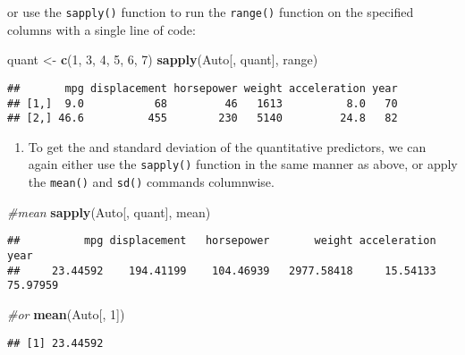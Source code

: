 \documentclass[
]{article}
\newenvironment{Shaded}{\begin{snugshade}}{\end{snugshade}}
\newcommand{\CommentTok}[1]{\textcolor[rgb]{0.56,0.35,0.01}{\textit{#1}}}
\newcommand{\DecValTok}[1]{\textcolor[rgb]{0.00,0.00,0.81}{#1}}
\newcommand{\FunctionTok}[1]{\textcolor[rgb]{0.13,0.29,0.53}{\textbf{#1}}}
\newcommand{\NormalTok}[1]{#1}
\newcommand{\OtherTok}[1]{\textcolor[rgb]{0.56,0.35,0.01}{#1}}
\providecommand{\tightlist}{%
  \setlength{\itemsep}{0pt}\setlength{\parskip}{0pt}}
\begin{document}
or use the \texttt{sapply()} function to run the \texttt{range()}
function on the specified columns with a single line of code:

\begin{Shaded}
\begin{Highlighting}[]
\NormalTok{quant }\OtherTok{\textless{}{-}} \FunctionTok{c}\NormalTok{(}\DecValTok{1}\NormalTok{, }\DecValTok{3}\NormalTok{, }\DecValTok{4}\NormalTok{, }\DecValTok{5}\NormalTok{, }\DecValTok{6}\NormalTok{, }\DecValTok{7}\NormalTok{)}
\FunctionTok{sapply}\NormalTok{(Auto[, quant], range)}
\end{Highlighting}
\end{Shaded}

\begin{verbatim}
##       mpg displacement horsepower weight acceleration year
## [1,]  9.0           68         46   1613          8.0   70
## [2,] 46.6          455        230   5140         24.8   82
\end{verbatim}

\begin{enumerate}
\def\labelenumi{\alph{enumi})}
\setcounter{enumi}{2}
\tightlist
\item
  To get the and standard deviation of the quantitative predictors, we
  can again either use the \texttt{sapply()} function in the same manner
  as above, or apply the \texttt{mean()} and \texttt{sd()} commands
  columnwise.
\end{enumerate}

\begin{Shaded}
\begin{Highlighting}[]
\CommentTok{\#mean}
\FunctionTok{sapply}\NormalTok{(Auto[, quant], mean)}
\end{Highlighting}
\end{Shaded}

\begin{verbatim}
##          mpg displacement   horsepower       weight acceleration         year 
##     23.44592    194.41199    104.46939   2977.58418     15.54133     75.97959
\end{verbatim}

\begin{Shaded}
\begin{Highlighting}[]
\CommentTok{\#or}
\FunctionTok{mean}\NormalTok{(Auto[, }\DecValTok{1}\NormalTok{])}
\end{Highlighting}
\end{Shaded}

\begin{verbatim}
## [1] 23.44592
\end{verbatim}
\end{document}
